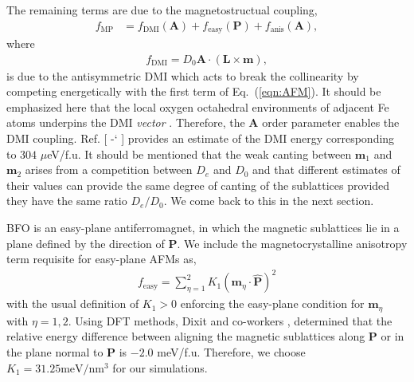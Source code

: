 \documentclass[%
 reprint,
superscriptaddress,
 amsmath,amssymb,
prb,
]{revtex4-1}
\newcommand*{\citen}[1]{%
  \begingroup
    \romannumeral-`\x %
    \setcitestyle{numbers}%
    \cite{#1}%
  \endgroup   
}
\begin{document}
%
The remaining terms are due to the magnetostructual coupling,
%
\begin{equation}\label{eqn:FmagMP}
\begin{aligned}
    f_\mathrm{MP} &= f_\mathrm{DMI}(\mathbf{A}) + f_\mathrm{easy}(\mathbf{P}) + f_\mathrm{anis}(\mathbf{A}),
\end{aligned}
\end{equation}
%
where
%
\begin{equation}\label{eqn:dmi}
\begin{aligned}
    f_\mathrm{DMI} = D_0 \textbf{A} \cdot \left( \textbf{L} \times \textbf{m}\right),
\end{aligned}
\end{equation}
%
is due to the antisymmetric DMI which acts to break the collinearity by competing energetically with the first term of Eq.~(\ref{eqn:AFM}).
%
It should be emphasized here that the local oxygen octahedral environments of adjacent Fe atoms underpins the DMI \emph{vector} \cite{Ederer2005, Fennie2008, deSousa2009, Rahmedov2012, Meyer2022}. 
%
Therefore, the $\mathbf{A}$ order parameter enables the DMI coupling.
%
Ref. [\citen{Dixit2015}] provides an estimate of the DMI energy corresponding to $304$ $\mu$eV/f.u. 
%
It should be mentioned that the weak canting between $\mathbf{m}_1$ and $\mathbf{m}_2$ arises from a competition between $D_e$ and $D_0$ and that different estimates of their values can provide the same degree of canting of the sublattices provided they have the same ratio $D_e/D_0$.
%
We come back to this in the next section.


%
BFO is an easy-plane antiferromagnet\cite{Dixit2015}, in which the magnetic sublattices lie in a plane defined by the direction of $\mathbf{P}$.
%
We include the magnetocrystalline anisotropy term\cite{Rezende2019} requisite for easy-plane AFMs as,
%
\begin{equation}\label{eqn:easy}
\begin{aligned}
    f_\mathrm{easy} = \sum\limits_{\eta = 1}^2 K_1 \left(\textbf{m}_\eta \cdot \hat{\textbf{P}}\right)^2
\end{aligned}
\end{equation}
%
with the usual definition of $K_1 > 0$ enforcing the easy-plane condition for $\mathbf{m}_\eta$ with $\eta = 1,2$.
%
Using DFT methods, Dixit and co-workers \cite{Dixit2015}, determined that the relative energy difference between aligning the magnetic sublattices along $\mathbf{P}$ or in the plane normal to $\mathbf{P}$ is $-2.0$ meV/f.u.
%
Therefore, we choose $K_1 = 31.25 \mathrm{meV}/\mathrm{nm}^3$ for our simulations.
%
\end{document}
